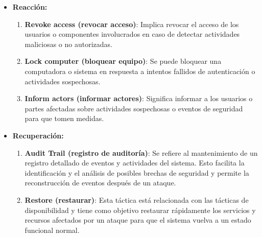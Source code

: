 \documentclass{article}
\begin{document}
\begin{itemize}
\begin{enumerate}
				\item \textbf{Limit exposure (reducir exposición)}: Implica limitar y restringir la exposición de API y servicios a través de cortafuegos y configuraciones de seguridad apropiadas para reducir la superficie de ataque del sistema.
				
				\item \textbf{Encrypt data (encriptar datos)}: Se refiere al uso de métodos de cifrado para proteger información confidencial durante el almacenamiento o la transmisión, asegurando que solo aquellos autorizados puedan acceder a ella.
				
								
			\end{enumerate}	
			
			\item \textbf{Reacción:}
			\begin{enumerate}
				\item \textbf{Revoke access (revocar acceso)}: Implica revocar el acceso de los usuarios o componentes involucrados en caso de detectar actividades maliciosas o no autorizadas.
				
				
				\item \textbf{Lock computer (bloquear equipo)}: Se puede bloquear una computadora o sistema en respuesta a intentos fallidos de autenticación o actividades sospechosas.
				
				
				\item \textbf{Inform actors (informar actores)}: Significa informar a los usuarios o partes afectadas sobre actividades sospechosas o eventos de seguridad para que tomen medidas.
				
			\end{enumerate}	
			
			\item \textbf{Recuperación:}
			\begin{enumerate}
				\item \textbf{Audit Trail (registro de auditoría)}: Se refiere al mantenimiento de un registro detallado de eventos y actividades del sistema. Esto facilita la identificación y el análisis de posibles brechas de seguridad y permite la reconstrucción de eventos después de un ataque.
				
				\item \textbf{Restore (restaurar)}: Esta táctica está relacionada con las tácticas de disponibilidad y tiene como objetivo restaurar rápidamente los servicios y recursos afectados por un ataque para que el sistema vuelva a un estado funcional normal.
				
				
			\end{enumerate}	
			
		\end{itemize}
		
\end{document}
